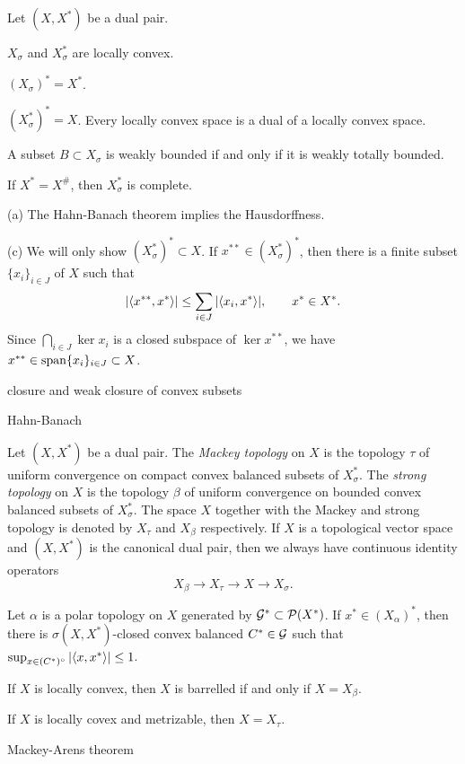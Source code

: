 \documentclass{../../large}
\begin{document}
\begin{prb}
Let $(X,X^*)$ be a dual pair.

\begin{parts}
\item $X_\sigma$ and $X^*_\sigma$ are locally convex.
\item $(X_\sigma)^*=X^*$.
\item $(X^*_\sigma)^*=X$. Every locally convex space is a dual of a locally convex space.
\item A subset $B\subset X_\sigma$ is weakly bounded if and only if it is weakly totally bounded.
\item If $X^*=X^\#$, then $X_\sigma^*$ is complete.
\end{parts}
\end{prb}
\begin{pf}
(a)
The Hahn-Banach theorem implies the Hausdorffness.

(c)
We will only show $(X^*_\sigma)^*\subset X$.
If $x^{**}\in(X^*_\sigma)^*$, then there is a finite subset $\{x_i\}_{i\in J}$ of $X$ such that
\[|\langle x^{**},x^*\rangle|\le\sum_{i\in J}|\langle x_i,x^*\rangle|,\qquad x^*\in X^*.\]
Since $\bigcap_{i\in J}\ker x_i$ is a closed subspace of $\ker x^{**}$, we have $x^{**}\in\operatorname{span}\{x_i\}_{i\in J}\subset X$.
\end{pf}

\begin{prb}
closure and weak closure of convex subsets
\end{prb}
\begin{pf}
Hahn-Banach
\end{pf}

\begin{prb}
Let $(X,X^*)$ be a dual pair.
The \emph{Mackey topology} on $X$ is the topology $\tau$ of uniform convergence on compact convex balanced subsets of $X^*_\sigma$.
The \emph{strong topology} on $X$ is the topology $\beta$ of uniform convergence on bounded convex balanced subsets of $X^*_\sigma$.
The space $X$ together with the Mackey and strong topology is denoted by $X_\tau$ and $X_\beta$ respectively.
If $X$ is a topological vector space and $(X,X^*)$ is the canonical dual pair, then we always have continuous identity operators
\[X_\beta\to X_\tau\to X\to X_\sigma.\]

Let $\alpha$ is a polar topology on $X$ generated by $\mathcal{G}^*\subset\mathcal{P}(X^*)$.
If $x^*\in(X_\alpha)^*$, then there is $\sigma(X,X^*)$-closed convex balanced $C^*\in\mathcal{G}$ such that $\sup_{x\in(C^*)^\circ}|\langle x,x^*\rangle|\le1$.


\begin{parts}
\item If $X$ is locally convex, then $X$ is barrelled if and only if $X=X_\beta$.
\item If $X$ is locally covex and metrizable, then $X=X_\tau$.
\item Mackey-Arens theorem
\end{parts}
\end{prb}
\end{document}

